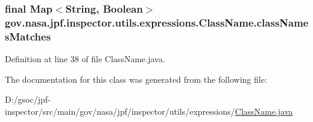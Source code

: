 \subsubsection[{\texorpdfstring{class\+Names\+Matches}{classNamesMatches}}]{\setlength{\rightskip}{0pt plus 5cm}final Map$<$String, Boolean$>$ gov.\+nasa.\+jpf.\+inspector.\+utils.\+expressions.\+Class\+Name.\+class\+Names\+Matches\hspace{0.3cm}{\ttfamily [private]}}\hypertarget{classgov_1_1nasa_1_1jpf_1_1inspector_1_1utils_1_1expressions_1_1_class_name_a8374b6f39099158e2c63a4de4d1bf613}{}\label{classgov_1_1nasa_1_1jpf_1_1inspector_1_1utils_1_1expressions_1_1_class_name_a8374b6f39099158e2c63a4de4d1bf613}


Definition at line 38 of file Class\+Name.\+java.



The documentation for this class was generated from the following file\+:\begin{DoxyCompactItemize}
\item 
D\+:/gsoc/jpf-\/inspector/src/main/gov/nasa/jpf/inspector/utils/expressions/\hyperlink{_class_name_8java}{Class\+Name.\+java}\end{DoxyCompactItemize}
